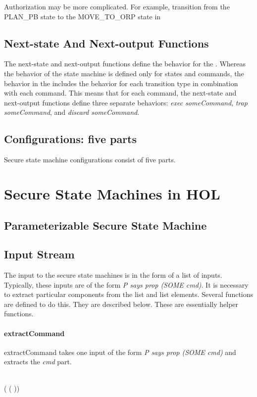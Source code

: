 \documentclass[../../main/main.tex]{subfiles}
\begin{document}
Authorization may be more complicated.  For example, transition from the PLAN_PB state to the MOVE_TO_ORP state in 

\subsection{Next-state And Next-output Functions}
The next-state and next-output functions define the behavior for the .  Whereas the behavior of the state machine is defined only for states and commands, the behavior in the  includes the behavior for each transition type in combination with each command.  This means that for each command, the next-state and next-output functions define three separate behaviors: \textit{exec someCommand}, \textit{trap someCommand}, and \textit{discard someCommand}.  

\subsection{Configurations: five parts}
Secure state machine configurations consist of five parts.


\section{Secure State Machines in HOL}\label{sec:sminHOL}

\subsection{Parameterizable Secure State Machine}
\subsection{Input Stream}
The input to the secure state machines is in the form of a list of inputs.  Typically, these inputs are of the form \textit{P says prop (SOME cmd)}.  It is necessary to extract particular components from the list and list elements.  Several functions are defined to do this.  They are described below.  These are essentially helper functions.

\paragraph*{extractCommand}
extractCommand takes one input of the form \textit{P says prop (SOME cmd)} and extracts the \textit{cmd} part.
\begin{tabbing}
\parskip=8pt
\HOLTokenTurnstile{} \\
\hspace{0.3cm} (   ( )) \HOLSymConst{=} 
\parskip=18pt
\end{tabbing}
\end{document}
